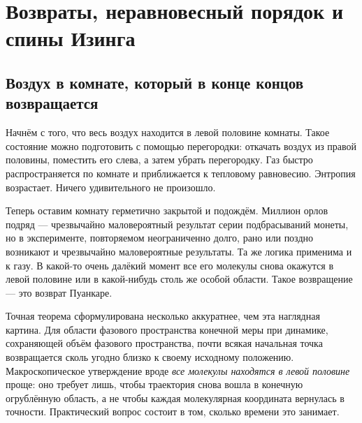 \chapter{Возвраты, неравновесный порядок и спины Изинга}


\section{Воздух в комнате, который в конце концов возвращается}

Начнём с того, что весь воздух находится в левой половине комнаты. Такое состояние можно подготовить с помощью перегородки: откачать воздух из правой половины, поместить его слева, а затем убрать перегородку. Газ быстро распространяется по комнате и приближается к тепловому равновесию. Энтропия возрастает. Ничего удивительного не произошло.

Теперь оставим комнату герметично закрытой и подождём. Миллион орлов подряд — чрезвычайно маловероятный результат серии подбрасываний монеты, но в эксперименте, повторяемом неограниченно долго, рано или поздно возникают и чрезвычайно маловероятные результаты. Та же логика применима и к газу. В какой-то очень далёкий момент все его молекулы снова окажутся в левой половине или в какой-нибудь столь же особой области. Такое возвращение — это возврат Пуанкаре.

Точная теорема сформулирована несколько аккуратнее, чем эта наглядная картина. Для области фазового пространства конечной меры при динамике, сохраняющей объём фазового пространства, почти всякая начальная точка возвращается сколь угодно близко к своему исходному положению. Макроскопическое утверждение вроде \emph{все молекулы находятся в левой половине} проще: оно требует лишь, чтобы траектория снова вошла в конечную огрублённую область, а не чтобы каждая молекулярная координата вернулась в точности. Практический вопрос состоит в том, сколько времени это занимает.

